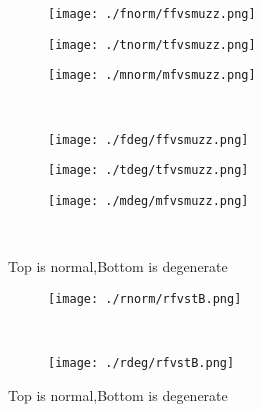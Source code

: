 \documentclass[aps,floats,floatfix,nofootinbib]{revtex4-1}
\begin{document}
\begin{center}
\begin{figure}
\begin{subfigure}{0.3\textwidth}
\texttt{[image: ./fnorm/ffvsmuzz.png]}
\label{}
\end{subfigure}
\begin{subfigure}{0.3\textwidth}
\texttt{[image: ./tnorm/tfvsmuzz.png]}
\label{}
\end{subfigure}
\begin{subfigure}{0.3\textwidth}
\texttt{[image: ./mnorm/mfvsmuzz.png]}
\label{}
\end{subfigure}\\
\begin{subfigure}{0.3\textwidth}
\texttt{[image: ./fdeg/ffvsmuzz.png]}
\label{}
\end{subfigure}
\begin{subfigure}{0.3\textwidth}
\texttt{[image: ./tdeg/tfvsmuzz.png]}
\label{}
\end{subfigure}
\begin{subfigure}{0.3\textwidth}
\texttt{[image: ./mdeg/mfvsmuzz.png]}
\label{}
\end{subfigure}\\
\caption{Top is normal,Bottom is degenerate}
\end{figure}
\end{center}

\begin{center}
\begin{figure}
\begin{subfigure}{0.95\textwidth}
\texttt{[image: ./rnorm/rfvstB.png]}
\label{}
\end{subfigure}\\
\begin{subfigure}{0.95\textwidth}
\texttt{[image: ./rdeg/rfvstB.png]}
\label{}
\end{subfigure}
\caption{Top is normal,Bottom is degenerate}
\end{figure}
\end{center}
\end{document}
